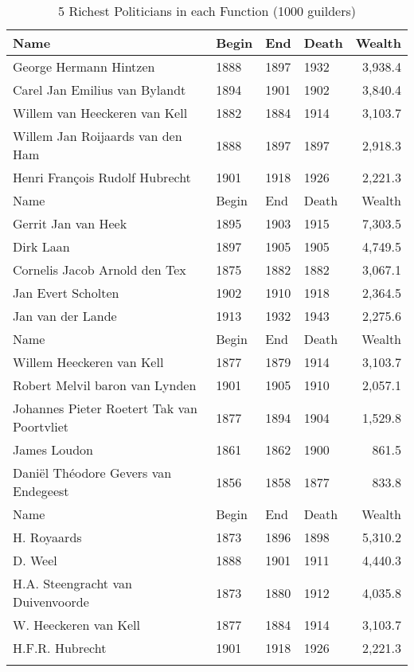 \begin{table}[ht]
\centering
\begin{tabular}{llllr}
   \hline
Name & Begin & End & Death & Wealth \\\hline
George Hermann Hintzen & 1888 & 1897 & 1932 & 3,938.4 \\
  Carel Jan Emilius van Bylandt & 1894 & 1901 & 1902 & 3,840.4 \\
  Willem van Heeckeren van Kell & 1882 & 1884 & 1914 & 3,103.7 \\
  Willem Jan Roijaards van den Ham & 1888 & 1897 & 1897 & 2,918.3 \\
  Henri François Rudolf Hubrecht & 1901 & 1918 & 1926 & 2,221.3 \\

\hline
Name & Begin & End & Death & Wealth \\\hline
Gerrit Jan van Heek & 1895 & 1903 & 1915 & 7,303.5 \\
  Dirk Laan & 1897 & 1905 & 1905 & 4,749.5 \\
  Cornelis Jacob Arnold den Tex & 1875 & 1882 & 1882 & 3,067.1 \\
  Jan Evert Scholten & 1902 & 1910 & 1918 & 2,364.5 \\
  Jan van der Lande & 1913 & 1932 & 1943 & 2,275.6 \\

\hline
Name & Begin & End & Death & Wealth \\\hline
Willem Heeckeren van Kell & 1877 & 1879 & 1914 & 3,103.7 \\
  Robert Melvil baron van Lynden & 1901 & 1905 & 1910 & 2,057.1 \\
  Johannes Pieter Roetert Tak van Poortvliet & 1877 & 1894 & 1904 & 1,529.8 \\
  James Loudon & 1861 & 1862 & 1900 & 861.5 \\
  Daniël Théodore Gevers van Endegeest & 1856 & 1858 & 1877 & 833.8 \\

\hline
Name & Begin & End & Death & Wealth \\\hline
H. Royaards & 1873 & 1896 & 1898 & 5,310.2 \\
  D. Weel & 1888 & 1901 & 1911 & 4,440.3 \\
  H.A. Steengracht van Duivenvoorde & 1873 & 1880 & 1912 & 4,035.8 \\
  W. Heeckeren van Kell & 1877 & 1884 & 1914 & 3,103.7 \\
  H.F.R. Hubrecht & 1901 & 1918 & 1926 & 2,221.3 \\
   \hline
\multicolumn{5}{l}{}\\
\end{tabular}
\caption{5 Richest Politicians in each Function (1000 guilders)}
\label{tab:richestpols}
\end{table}
